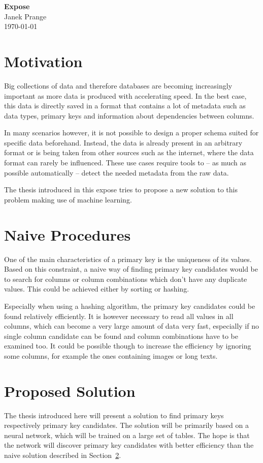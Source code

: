 \documentclass[a4paper]{article}
\begin{document}
\thispagestyle{firstpagestyle}
\begin{center}
  \huge \textbf{Expose}\\[8pt]
  \normalsize Janek Prange\\
  \today
\end{center}

\section{Motivation}
Big collections of data and therefore databases are becoming increasingly important as more data is produced with accelerating speed. In the best case, this data is directly saved in a format that contains a lot of metadata such as data types, primary keys and information about dependencies between columns.

In many scenarios however, it is not possible to design a proper schema suited for specific data beforehand. Instead, the data is already present in an arbitrary format or is being taken from other sources such as the internet, where the data format can rarely be influenced. These use cases require tools to -- as much as possible automatically -- detect the needed metadata from the raw data. %

The thesis introduced in this expose tries to propose a new solution to this problem making use of machine learning.


\section{Naive Procedures}\label{sec:naiveProcedures}
One of the main characteristics of a primary key is the uniqueness of its values. Based on this constraint, a naive way of finding primary key candidates would be to search for columns or column combinations which don't have any duplicate values. This could be achieved either by sorting or hashing.

Especially when using a hashing algorithm, the primary key candidates could be found relatively efficiently. It is however necessary to read all values in all columns, which can become a very large amount of data very fast, especially if no single column candidate can be found and column combinations have to be examined too. It could be possible though to increase the efficiency by ignoring some columns, for example the ones containing images or long texts.


\section{Proposed Solution}\label{sec:proposedSolution}
The thesis introduced here will present a solution to find primary keys respectively primary key candidates. The solution will be primarily based on a neural network, which will be trained on a large set of tables. The hope is that the network will discover primary key candidates with better efficiency than the naive solution described in Section~\ref{sec:naiveProcedures}.
\end{document}
